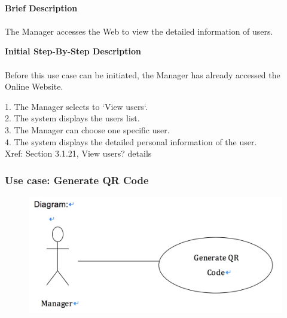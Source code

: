 \documentclass[12pt]{report}
\begin{document}
\paragraph{}
\begin{flushleft}
\textbf{Brief Description }
\paragraph{}
The Manager accesses the Web to view the detailed information of users.\\

\begin{flushleft}
\textbf{Initial Step-By-Step Description }
\paragraph{}
Before this use case can be initiated, the Manager has already accessed the Online Website.

\begin{flushleft}
1.	The Manager selects to `View users`. \\
2.	The system displays the users list. \\
3.	The Manager can choose one specific user. \\
4.	The system displays the detailed personal information of the user. \\
Xref: Section 3.1.21, View users? details
\end{flushleft}
\end{flushleft}
\end{flushleft}

\newpage
\subsubsection{Use case:  Generate QR Code }

\begin{figure}[!htb]
  \includegraphics{28.PNG}
\end{figure}
\end{document}
